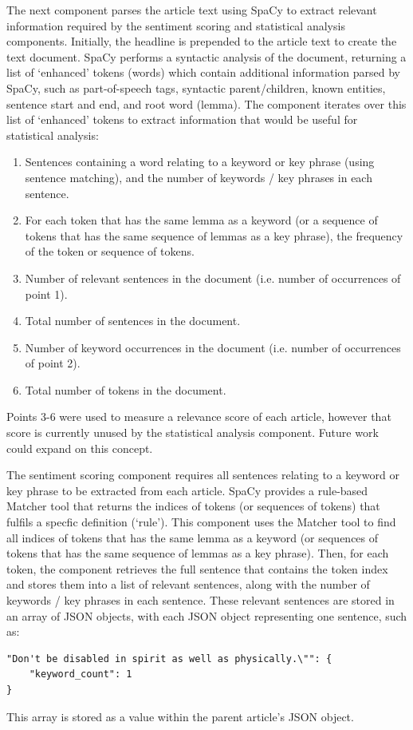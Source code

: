 \documentclass{report}
\begin{document}
The next component parses the article text using SpaCy \cite{SpaCy} to extract relevant information required by the sentiment scoring and statistical analysis components.
Initially, the headline is prepended to the article text to create the text document.
SpaCy performs a syntactic analysis of the document, returning a list of `enhanced' tokens (words) which contain additional information parsed by SpaCy, such as part-of-speech tags, syntactic parent/children, known entities, sentence start and end, and root word (lemma).
The component iterates over this list of `enhanced' tokens to extract information that would be useful for statistical analysis:
\begin{enumerate}
	\item Sentences containing a word relating to a keyword or key phrase (using sentence matching), and the number of keywords / key phrases in each sentence.
	\item For each token that has the same lemma as a keyword (or a sequence of tokens that has the same sequence of lemmas as a key phrase), the frequency of the token or sequence of tokens.
	\item Number of relevant sentences in the document (i.e. number of occurrences of point 1).
	\item Total number of sentences in the document.
	\item Number of keyword occurrences in the document (i.e. number of occurrences of point 2).
	\item Total number of tokens in the document.
\end{enumerate}
Points 3-6 were used to measure a relevance score of each article, however that score is currently unused by the statistical analysis component. 
Future work could expand on this concept.

The sentiment scoring component requires all sentences relating to a keyword or key phrase to be extracted from each article.
SpaCy provides a rule-based Matcher tool that returns the indices of tokens (or sequences of tokens) that fulfils a specfic definition (`rule').
This component uses the Matcher tool to find all indices of tokens that has the same lemma as a keyword (or sequences of tokens that has the same sequence of lemmas as a key phrase).
Then, for each token, the component retrieves the full sentence that contains the token index and stores them into a list of relevant sentences, along with the number of keywords / key phrases in each sentence.
These relevant sentences are stored in an array of JSON objects, with each JSON object representing one sentence, such as:
\begin{lstlisting}
"Don't be disabled in spirit as well as physically.\"": {
	"keyword_count": 1
}
\end{lstlisting}
This array is stored as a value within the parent article's JSON object.
\end{document}
